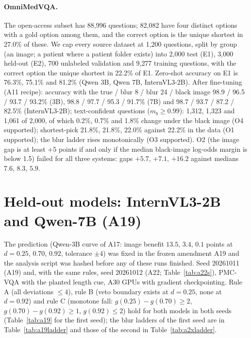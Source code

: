 \paragraph{OmniMedVQA.}
The open-access subset has 88{,}996 questions; 82{,}082 have four distinct options with a gold option among them, and the correct option is the unique shortest in 27.0\% of these.
We cap every source dataset at 1{,}200 questions, split by group (an image; a patient where a patient folder exists) into 2{,}000 test (E1), 3{,}000 held-out (E2), 700 unlabeled validation and 9{,}277 training questions, with the correct option the unique shortest in 22.2\% of E1.
Zero-shot accuracy on E1 is 76.3\%, 75.1\% and 81.2\% (Qwen 3B, Qwen 7B, InternVL3-2B).
After fine-tuning (A11 recipe): accuracy with the true / blur 8 / blur 24 / black image 98.9 / 96.5 / 93.7 / 93.2\% (3B), 98.8 / 97.7 / 95.3 / 91.7\% (7B) and 98.7 / 93.7 / 87.2 / 82.5\% (InternVL3-2B); text-confident questions ($m_b\ge0.99$): 1{,}312, 1{,}323 and 1{,}061 of 2{,}000, of which 0.2\%, 0.7\% and 1.8\% change under the black image (O4 supported); shortest-pick 21.8\%, 21.8\%, 22.0\% against 22.2\% in the data (O1 supported); the blur ladder rises monotonically (O3 supported).
O2 (the image gap is at least $+5$ points if and only if the median black-image log-odds margin is below 1.5) failed for all three systems: gaps $+5.7$, $+7.1$, $+16.2$ against medians $7.6$, $8.3$, $5.9$.

\section{Held-out models: InternVL3-2B and Qwen-7B (A19)}
\label{app:a19}

The prediction (Qwen-3B curve of A17: image benefit $13.5$, $3.4$, $0.1$ points at $d=0.25$, $0.70$, $0.92$, tolerance $\pm4$) was fixed in the frozen amendment A19 and the analysis script was hashed before any of these runs finished.
Seed 20261011 (A19) and, with the same rules, seed 20261012 (A22; Table~\ref{tab:a22s}), PMC-VQA with the planted length cue, A30 GPUs with gradient checkpointing.
Rule A (all deviations $\le4$), rule B (veto boundary exists at $d=0.25$, none at $d=0.92$) and rule C (monotone fall: $g(0.25)-g(0.70)\ge2$, $g(0.70)-g(0.92)\ge1$, $g(0.92)\le2$) hold for both models in both seeds (Table~\ref{tab:a19} for the first seed); the blur ladders of the first seed are in Table~\ref{tab:a19ladder} and those of the second in Table~\ref{tab:a2xladder}.

